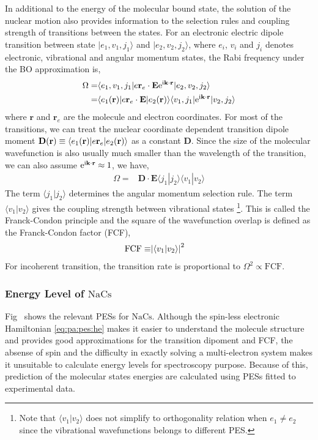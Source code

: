 In additional to the energy of the molecular bound state,
the solution of the nuclear motion also provides information to the selection rules
and coupling strength of transitions between the states.
For an electronic electric dipole transition between state
$|e_1,v_1,j_1\rangle$ and $|e_2,v_2,j_2\rangle$,
where $e_i$, $v_i$ and $j_i$ denotes electronic, vibrational and angular momentum states,
the Rabi frequency under the BO approximation is,
\begin{align*}
  \Omega=&\langle e_1,v_1,j_1|e\mathbf{r}_e\cdot\mathbf{E}\mathrm{e}^{\mathrm{i}\mathbf{k}\cdot\mathbf{r}}|e_2,v_2,j_2\rangle\\
  =&\langle e_1(\mathbf{r})|e\mathbf{r}_e\cdot\mathbf{E}|e_2(\mathbf{r})\rangle\langle v_1,j_1|\mathrm{e}^{\mathrm{i}\mathbf{k}\cdot\mathbf{r}}|v_2,j_2\rangle
\end{align*}
where $\mathbf{r}$ and $\mathbf{r}_e$ are the molecule and electron coordinates.
For most of the transitions, we can treat the nuclear coordinate dependent transition dipole
moment $\mathbf{D}{\left({\mathbf{r}}\right)}\equiv\langle e_1(\mathbf{r})|e\mathbf{r}_e|e_2(\mathbf{r})\rangle$ as a constant $\mathbf{D}$.
Since the size of the molecular wavefunction is also usually much smaller than
the wavelength of the transition, we can also assume $\mathrm{e}^{\mathrm{i}\mathbf{k}\cdot\mathbf{r}}\approx 1$,
we have,
\begin{align*}
  \Omega=&\mathbf{D}\cdot\mathbf{E}\langle j_1|j_2\rangle\langle v_1|v_2\rangle
\end{align*}
The term $\langle j_1|j_2\rangle$ determines the angular momentum selection rule.
The term $\langle v_1|v_2\rangle$ gives the coupling strength between vibrational states
\footnote{Note that $\langle v_1|v_2\rangle$ does not simplify to orthogonality relation
  when $e_1\neq e_2$ since the vibrational wavefunctions belongs to different PES.}.
This is called the Franck-Condon principle and the square of the wavefunction overlap
is defined as the Franck-Condon factor (FCF),
\begin{align*}
  \mathrm{FCF}\equiv&{\left|{\langle v_1|v_2\rangle}\right|}^2
\end{align*}
For incoherent transition, the transition rate is proportional to $\Omega^2\propto\mathrm{FCF}$.

\subsubsection{Energy Level of $\mathrm{NaCs}$}

Fig~\todo{\ref{}} shows the relevant PESs for $\mathrm{NaCs}$.
Although the spin-less electronic Hamiltonian \ref{eq:pa:pes:he} makes it easier
to understand the molecule structure and provides good approximations for the
transition dipoment and FCF, the absense of spin and the difficulty in exactly solving
a multi-electron system makes it unsuitable to calculate energy levels
for spectroscopy purpose.
Because of this, prediction of the molecular states energies are calculated using
PESs fitted to experimental data\todo{\cite{}}.

